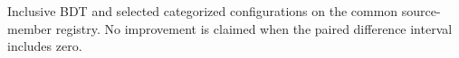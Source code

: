 Inclusive BDT and selected categorized configurations on the common source-member registry. No improvement is claimed when the paired difference interval includes zero.
